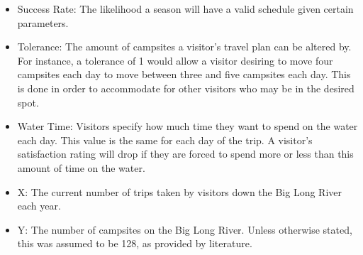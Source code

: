 \documentclass[11pt]{article} %
\begin{document}
\begin{itemize}
\item Success Rate: The likelihood a season will have a valid schedule
given certain parameters.

\item Tolerance: The amount of campsites a visitor's travel plan can be
altered by. For instance, a tolerance of 1 would allow a visitor desiring
to move four campsites each day to move between three and five campsites
each day. This is done in order to accommodate for other visitors who may
be in the desired spot.

\item Water Time: Visitors specify how much time they want to spend on the
water each day. This value is the same for each day of the trip. A visitor's
satisfaction rating will drop if they are forced to spend
more or less than this amount of time on the water.

\item X: The current number of trips taken by visitors down the Big Long River
each year.

\item Y: The number of campsites on the Big Long River. Unless otherwise stated,
this was assumed to be 128, as provided by literature\cite{NumCampsites}.
\end{itemize}
\end{document}
